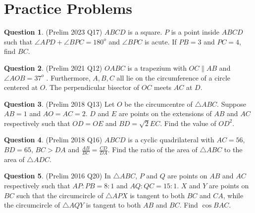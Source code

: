 \documentclass{article}
\theoremstyle{definition}
\newtheorem{question}{Question}
\begin{document}
	\section{Practice Problems}
	\begin{question}
		(Prelim 2023 Q17) $ABCD$ is a square. $P$ is a point inside $ABCD$ such that $\angle APD + \angle BPC = 180^o$ and  $\angle BPC$ is acute.  If $PB = 3$ and $PC = 4$, find $BC$.
	\end{question}
	\vfill
	\begin{question}
		(Prelim 2021 Q12) $OABC$ is a trapezium with $OC \parallel AB$ and $\angle AOB = 37^o$	. Furthermore, $A,B,C$ all lie on the circumference of a circle centered at $O$. The perpendicular bisector of $OC$ meets $AC$ at $D$.
	\end{question}
	\vfill
	\newpage
	\begin{question}
		(Prelim 2018 Q13) Let $O$ be the circumcentre of $\triangle ABC$. Suppose $AB = 1$ and $AO = AC = 2$. $D$ and $E$ are points on the extensions of $AB$ and $A C$ respectively such that $OD = OE $ and $BD = \sqrt{2} EC$. Find the value of $OD^2$.
	\end{question}
	\vfill
	\begin{question}
		(Prelim 2018 Q16) $ABCD$ is a cyclic quadrilateral with $AC=56$, $BD=65$, $BC>DA$ and $\frac{AB}{BC} = \frac{CD}{DA}$. Find the ratio of the area of $\triangle ABC$ to the area of $\triangle ADC$.
	\end{question}
	\vfill
	\newpage
	\begin{question}
		(Prelim 2016 Q20) In $\triangle ABC$, $P$ and $Q$ are points on $AB$ and $AC$ respectively such that $AP:PB=8:1$ and $AQ:QC=15:1$.  $X$ and $Y$ are points on $BC$ such that the circumcircle of $\triangle APX$ is tangent to both $BC$ and $CA$, while the circumcircle of  $\triangle AQY$ is tangent to both $AB$ and $BC$. Find $\cos BAC$.
	\end{question}
\end{document}
